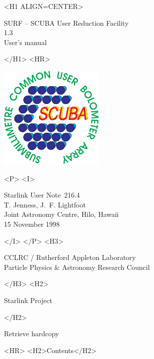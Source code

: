 \documentclass[twoside,11pt]{article}
\newcommand{\stardoccategory}  {Starlink User Note}
\newcommand{\stardocsource}    {sun\stardocnumber}
\newcommand{\stardocnumber}    {216.4}
\newcommand{\stardocauthors}   {T. Jenness, J.~F. Lightfoot\\
                                Joint Astronomy Centre, Hilo, Hawaii}
\newcommand{\stardocdate}      {15 November 1998}
\newcommand{\stardoctitle}     {SURF -- SCUBA User Reduction Facility}
\newcommand{\stardocversion}   {1.3}
\newcommand{\stardocmanual}    {User's manual}
\newcommand{\htmladdnormallink}[2]{#1}
\newcommand{\htmladdimg}[1]{}
\newcommand{\htmlref}[2]{#1}
\newcommand{\htmladdtonavigation}[1]{}
\newcommand{\xlabel}[1]{}
\renewcommand{\_}{\texttt{\symbol{95}}}
\begin{document}
\begin{htmlonly}
   \xlabel{}
   \begin{rawhtml} <H1 ALIGN=CENTER> \end{rawhtml}
      \stardoctitle\\
      \stardocversion\\
      \stardocmanual
   \begin{rawhtml} </H1> <HR> \end{rawhtml}

\includegraphics[width=2.0in]{sun216_logo.eps}

   \begin{rawhtml} <P> <I> \end{rawhtml}
   \stardoccategory\ \stardocnumber \\
   \stardocauthors \\
   \stardocdate
   \begin{rawhtml} </I> </P> <H3> \end{rawhtml}
      \htmladdnormallink{CCLRC}{http://www.cclrc.ac.uk} /
      \htmladdnormallink{Rutherford Appleton Laboratory}
                        {http://www.cclrc.ac.uk/ral} \\
      \htmladdnormallink{Particle Physics \& Astronomy Research Council}
                        {http://www.pparc.ac.uk} \\
   \begin{rawhtml} </H3> <H2> \end{rawhtml}
      \htmladdnormallink{Starlink Project}{http://star-www.rl.ac.uk/}
   \begin{rawhtml} </H2> \end{rawhtml}
   \htmladdnormallink{\htmladdimg{source.gif} Retrieve hardcopy}
      {http://star-www.rl.ac.uk/cgi-bin/hcserver?\stardocsource}\\

  \label{stardoccontents}
  \begin{rawhtml} 
    <HR>
    <H2>Contents</H2>
  \end{rawhtml}
  \htmladdtonavigation{\htmlref{\htmladdimg{contents_motif.gif}}
        {stardoccontents}}


\end{htmlonly}
\end{document}
